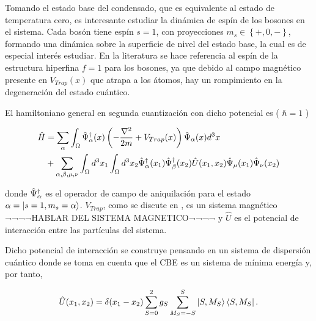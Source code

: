

Tomando el estado base del condensado, que es equivalente al estado de temperatura cero, es interesante estudiar la dinámica de espín de los bosones en el sistema. Cada bosón tiene espín $s = 1$, con proyecciones $m_s \in \left\lbrace +,0,- \right\rbrace$, formando una dinámica sobre la superficie de nivel del estado base, la cual es de especial interés estudiar. En la literatura \cite{law98} se hace referencia al espín de la estructura hiperfina $f = 1$ para los bosones, ya que debido al campo magnético presente en $V_{Trap}(x)$ que atrapa a los átomos, hay un rompimiento en la degeneración del estado cuántico. 

El hamiltoniano general en segunda cuantización con dicho potencial es ( $ \hbar = 1$ )

\begin{equation}
\begin{split}
\hat{H} & = \sum_{\alpha} \int_{\Omega} \hat{\Psi}^{\dagger}_\alpha(x) \left( -\frac{\nabla^2}{2m} + V_{Trap}(x) \right) \hat{\Psi}_{\alpha}(x) d^3x \\ 
& + \sum_{\alpha,\beta, \mu, \nu} \int_{\Omega} d^3x_1 \int_{\Omega} d^3x_2  	\hat{\Psi}^{\dagger}_\alpha(x_1) \hat{\Psi}^{\dagger}_\beta(x_2) \hat{U}(x_1,x_2) \hat{\Psi}_{\mu}(x_1) \hat{\Psi}_{\nu}(x_2)
\end{split}
\label{gen_ham}
\end{equation}

donde $\hat{\Psi}^{\dagger}_\alpha$ es el operador de campo de aniquilación para el estado $\alpha = \left|s=1,m_s=\alpha\right\rangle$. 
$V_{Trap}$, como se discute en \cite{trap}, es un sistema magnético ¬¬¬¬HABLAR DEL SISTEMA MAGNETICO¬¬¬¬ y $\hat{U}$ es el potencial de interacción entre las partículas del sistema.

Dicho potencial de interacción se construye pensando en un sistema de dispersión cuántico donde se toma en cuenta que el CBE es un sistema de mínima energía y, por tanto, 

\begin{equation}
\hat{U}(x_1,x_2) = \delta{(x_1 - x_2)} \sum_{S=0}^2 g_S \sum_{M_S=-S}^S \left|S,M_S\right\rangle\left\langle S,M_S\right|.
\label{pseudopot}
\end{equation}

